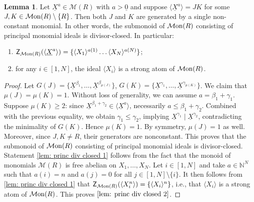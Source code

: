 \documentclass[a4paper,10pt,reqno]{amsart}
\theoremstyle{definition}
\newtheorem{lemma}[theorem]{Lemma}
\theoremstyle{definition}
\providecommand\Mon{{\mathcal{M}{\rm on}}}
\begin{document}
\begin{lemma}\label{lem: princ div closed}
    Let $\underline X^a\in \mathcal M(R)$ with $a>\underline 0$ and suppose $\langle \underline X^a\rangle = JK$ for some $J,K\in\Mon(R)\setminus\{R\}$. Then both $J$ and $K$ are generated by a single non-constant monomial. In other words, the submonoid of $\Mon(R)$ consisting of principal monomial ideals is divisor-closed. In particular:
    \begin{enumerate}[label=\textup{(\arabic{*})}, mode=unboxed]
    \item\label{lem: princ div closed 1} $\mathsf Z_{\Mon(R)}(\langle \underline X^a\rangle) = \{ \langle X_1\rangle^{a(1)}\dots\langle X_N\rangle^{a(N)}\}$;
    \item\label{lem: princ div closed 2} for any $i\in [1,N]$, the ideal $\langle X_i\rangle$ is a strong atom of $\Mon(R)$.
    \end{enumerate}
\end{lemma}

\begin{proof}
    Let $G(J) = \{\underline X^{\beta_1}, \dots, \underline X^{\beta_{\mu(J)}}\}$, $G(K) = \{ \underline X^{\gamma_1}, \dots, \underline X^{\gamma_{\mu(K)}}\}$. We claim that $\mu(J)=\mu(K)=1$. Without loss of generality, we can assume $a=\beta_1+\gamma_1$. Suppose $\mu(K) \ge 2$: since $\underline X^{\beta_1+\gamma_2}\in \langle \underline X^a\rangle$, necessarily $a\le \beta_1+\gamma_2$. Combined with the previous equality, we obtain $\gamma_1\le \gamma_2$, implying $\underline X^{\gamma_1} \mid \underline X^{\gamma_2}$, contradicting the minimality of $G(K)$. Hence $\mu(K)=1$. By symmetry, $\mu(J)=1$ as well. Moreover, since $J,K\ne R$, their generators are nonconstant. This proves that the submonoid of $\Mon(R)$ consisting of principal monomial ideals is divisor-closed. Statement \ref{lem: princ div closed 1} follows from the fact that the monoid of monomials $\mathcal M(R)$ is free abelian on $X_1, \ldots,X_N$. Let $i\in [1,N]$ and take $a\in\mathbb N^N$ such that $a(i)=n$ and $a(j)=0$ for all $j\in [1,N]\setminus \{i\}$. It then follows from \ref{lem: princ div closed 1} that $\mathsf Z_{\Mon(R)}(\langle X_i^n\rangle) = \{ \langle X_i\rangle^{n}\}$, i.e., that $\langle X_i\rangle$ is a strong atom of $\Mon(R)$. This proves $\ref{lem: princ div closed 2}$.
    \end{proof}
\end{document}
